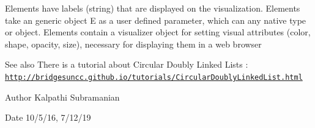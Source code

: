 Elements have labels (string) that are displayed on the visualization. Elements take an generic object E as a user defined parameter, which can any native type or object. Elements contain a visualizer object for setting visual attributes (color, shape, opacity, size), necessary for displaying them in a web browser

\begin{DoxySeeAlso}{See also}
There is a tutorial about Circular Doubly Linked Lists \+: \href{http://bridgesuncc.github.io/tutorials/CircularDoublyLinkedList.html}{\tt http\+://bridgesuncc.\+github.\+io/tutorials/\+Circular\+Doubly\+Linked\+List.\+html}
\end{DoxySeeAlso}
\begin{DoxyAuthor}{Author}
Kalpathi Subramanian 
\end{DoxyAuthor}
\begin{DoxyDate}{Date}
10/5/16, 7/12/19 
\end{DoxyDate}
